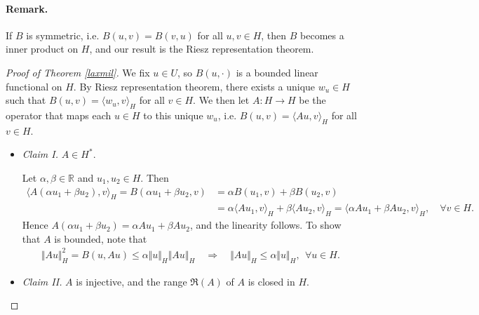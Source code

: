\documentclass{article}
\numberwithin{equation}{section}
\newcommand{\bbR}{\mathbb{R}}
\theoremstyle{plain}
\theoremstyle{definition}
\begin{document}
\paragraph{Remark.} If $B$ is symmetric, i.e. $B(u,v)=B(v,u)$ for all $u,v\in H$, then $B$ becomes a inner product on $H$, and our result is the Riesz representation theorem.
\begin{proof}[Proof of Theorem \ref{laxmil}]
We fix $u\in U$, so $B(u,\cdot)$ is a bounded linear functional on $H$. By Riesz representation theorem, there exists a unique $w_u\in H$ such that $B(u,v)=\langle w_u,v\rangle_H$ for all $v\in H$. We then let $A:H\to H$ be the operator that maps each $u\in H$ to this unique $w_u$, i.e. $B(u,v)=\langle Au,v\rangle_H$ for all $v\in H$.

\begin{itemize}
\item\textit{Claim I.} $A\in H^*$.

Let $\alpha,\beta\in\bbR$ and $u_1,u_2\in H$. Then 
\begin{align*}
	\langle A(\alpha u_1+\beta u_2),v\rangle_H=B(\alpha u_1+\beta u_2,v)&=\alpha B(u_1,v)+\beta B(u_2,v)\\
	&=\alpha\langle Au_1,v\rangle_H+\beta\langle Au_2,v\rangle_H=\langle\alpha Au_1+\beta Au_2,v\rangle_H,\quad\forall v\in H.
\end{align*}
Hence $A(\alpha u_1+\beta u_2)=\alpha Au_1+\beta Au_2$, and the linearity follows. To show that $A$ is bounded, note that
\begin{align*}
	\Vert Au\Vert_H^2=B(u,Au)\leq\alpha\Vert u\Vert_H\Vert Au\Vert_H\quad\Rightarrow\quad\Vert Au\Vert_H\leq\alpha\Vert u\Vert_H,\ \ \forall u\in H.
\end{align*}
\item\textit{Claim II.} $A$ is injective, and the range $\mathfrak{R}(A)$ of $A$ is closed in $H$.


\end{itemize}
\end{proof}
\end{document}
